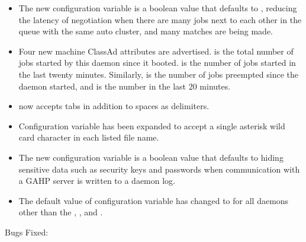 \begin{itemize}

\item The new configuration variable 
is a boolean value that defaults to , 
reducing the latency of negotiation 
when there are many jobs next to each other in the queue 
with the same auto cluster, and many matches are being made.

\item Four new machine ClassAd attributes are advertised.
 is the total number of jobs started by 
this  daemon since it booted. 
 is the number of jobs started in the
last twenty minutes.  
Similarly,  is
the number of jobs preempted since the  daemon started,
and  is 
the number in the last 20 minutes.

\item {} now accepts tabs in addition to spaces as delimiters.

\item Configuration variable  has been expanded
to accept a single asterisk wild card character in each listed file name.

\item The new configuration variable 
is a boolean value that defaults to hiding sensitive data 
such as security keys and passwords
when communication with a GAHP server is written to a daemon log.

\item The default value of configuration variable 
 has changed to  for all
daemons other than the , , and .

\end{itemize}

\noindent Bugs Fixed:

